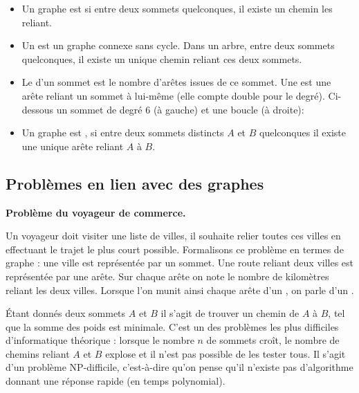 \documentclass[11pt,class=report,crop=false]{standalone}
\begin{document}
\begin{itemize}
	\item Un graphe est  si entre deux sommets quelconques, il existe un chemin les reliant.
	\item Un  est un graphe connexe sans cycle. Dans un arbre, entre deux sommets quelconques, il existe un unique chemin reliant ces deux sommets.
	\item Le  d'un sommet est le nombre d'arêtes issues de ce sommet.
	Une  est une arête reliant un sommet à lui-même (elle compte double pour le degré). Ci-dessous un sommet de degré $6$ (à gauche) et une boucle (à droite):
	\item Un graphe est , si entre deux sommets distincts $A$ et $B$ quelconques il existe une unique arête reliant $A$ à $B$.
		
\end{itemize}



\subsection{Problèmes en lien avec des graphes}


\textbf{Problème du voyageur de commerce.}

Un voyageur doit visiter une liste de villes, il souhaite relier toutes ces villes en effectuant le trajet le plus court possible. 
Formalisons ce problème en termes de graphe : une ville est représentée par un sommet.
Une route reliant deux villes est représentée par une arête. Sur chaque arête on note le nombre de kilomètres reliant les deux villes. 
Lorsque l'on munit ainsi chaque arête d'un , on parle d'un .

\'Etant donnés deux sommets $A$ et $B$ il s'agit de trouver un chemin de $A$ à $B$, tel que la somme des poids est minimale.
C'est un des problèmes les plus difficiles d'informatique théorique : lorsque le nombre $n$ de sommets croît, le nombre de chemins reliant $A$ et $B$ explose et il n'est pas possible de les tester tous. Il s'agit d'un problème NP-difficile, c'est-à-dire qu'on pense qu'il n'existe pas d'algorithme donnant une réponse rapide (en temps polynomial).
\end{document}
